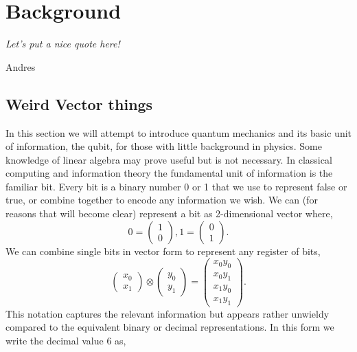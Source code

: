 \chapter{Background}
\label{Background}

\epigraph{\textit{Let's put a nice quote here!}}{Andres}

\section{Weird Vector things}\label{TheBasics}


In this section we will attempt to introduce quantum mechanics and its basic unit of information, the qubit, for those with little background in physics. Some knowledge of linear algebra may prove useful but is not necessary.  
In classical computing and information theory the fundamental unit of information is the familiar bit. Every bit is a binary number 0 or 1 that we use to represent false or true, or combine together to encode any information we wish. We can (for reasons that will become clear) represent 
a bit as 2-dimensional vector where,
\begin{equation}
0 = \begin{pmatrix} 1\\ 0 \end{pmatrix},
1 = \begin{pmatrix} 0\\ 1 \end{pmatrix}.
\end{equation}
We can combine single bits in vector form to represent any register of bits,
\begin{equation}
\begin{pmatrix} x_0\\ x_1 \end{pmatrix} \otimes
\begin{pmatrix} y_0\\ y_1 \end{pmatrix}
= \begin{pmatrix} x_0 y_0 \\ x_0 y_1 \\ x_1 y_0 \\ x_1 y_1 \end{pmatrix}.
\end{equation}
This notation captures the relevant information but appears rather unwieldy compared to the equivalent binary or decimal representations.
In this form we write the decimal value 6 as,
